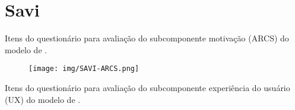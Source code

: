 \begin{comment}
\chapter{Morbi ultrices rutrum lorem.}
\lipsum[30]

\chapter{Cras non urna sed feugiat cum sociis natoque penatibus et magnis dis
parturient montes nascetur ridiculus mus}

\lipsum[31]

\chapter{Fusce facilisis lacinia dui}

\lipsum[32]
\end{comment}



\chapter{Savi}
\label{chap:A1}

Itens do questionário para avaliação do subcomponente motivação (ARCS) do modelo de .

\begin{figure}[h]
	\centering
	\texttt{[image: img/SAVI-ARCS.png]}
	\label{fig:anexo1}\\
\end{figure}

\newpage


Itens do questionário para avaliação do subcomponente experiência do usuário (UX) do modelo de .\label{chap:A2}


